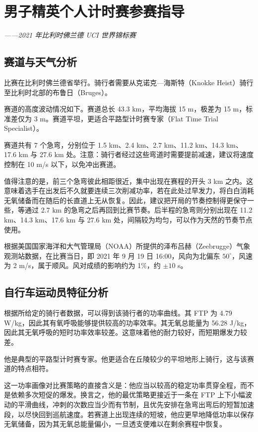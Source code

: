 \documentclass[11pt,a4paper]{ctexart}
\begin{document}
\section*{男子精英个人计时赛参赛指导}

\noindent\emph{——2021 年比利时佛兰德 UCI 世界锦标赛}

\subsection*{赛道与天气分析}

比赛在比利时佛兰德省举行。骑行者需要从克诺克—海斯特（Knokke Heist）骑行至比利时北部的布鲁日（Bruges）。

赛道的高度波动情况如下。赛道总长 43.3 km，平均海拔 15 m，极差为 15 m，标准差仅为 3 m。赛道平坦，更适合平路型计时赛专家（Flat Time Trial Specialist）。

赛道共有 7 个急弯，分别位于 1.5 km、2.4 km、2.7 km、11.2 km、14.3 km、17.6 km 与 27.6 km 处。注意：骑行者经过这些弯道时需要提前减速，建议将速度控制在 10 m/s 以下，以免冲出赛道。

值得注意的是，前三个急弯彼此相距很近，集中出现在赛程的开头 3 km 之内。这意味着选手在出发后不久就要连续三次削减功率，若在此处过早发力，将白白消耗无氧储备而在随后的长直道上无从恢复。因此，建议把开局的节奏控制得更保守一些，等通过 2.7 km 的急弯之后再回到比赛节奏。后半程的急弯则分别出现在 11.2 km、14.3 km、17.6 km 与 27.6 km 处，间隔较为均匀，可以作为天然的节奏节点使用。

根据美国国家海洋和大气管理局（NOAA）所提供的泽布吕赫（Zeebrugge）气象观测站数据，在比赛当日，即 2021 年 9 月 19 日 16:00，风向为北偏东 $50^\circ$，风速为 2 m/s，属于顺风。风对成绩的影响约为 1\%，约 $\pm 10$ s。

\subsection*{自行车运动员特征分析}

根据所给定的骑行者数据，可以得到该骑行者的功率曲线。其 FTP 为 4.79 W/kg，因此其有氧呼吸能够提供较高的功率效率。其无氧总能量为 56.28 J/kg，因此其无氧呼吸的短时功率效率较差。这意味着他的耐力较好，而短期爆发力较差。

他是典型的平路型计时赛专家。他更适合在丘陵较少的平坦地形上骑行，这与该赛道的特点相符。

这一功率画像对比赛策略的直接含义是：他应当以较高的稳定功率贯穿全程，而不是依赖多次短促的爆发。换言之，他的最优策略更接近于一条在 FTP 上下小幅波动的平滑曲线，冲刺的次数应当少而有节制，且优先安排在急弯出弯后的短暂加速段，以尽快回到巡航速度。若赛道上出现连续的短坡，他应更早地降低功率以保存无氧储备，因为其无氧总能量偏小，一旦透支便难以在剩余赛程中恢复。
\end{document}
